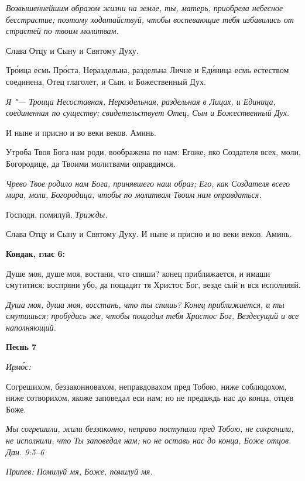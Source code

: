 \itshape Возвышеннейшим образом жизни на земле, ты, матерь, приобрела небесное бесстрастие; поэтому ходатайствуй, чтобы воспевающие тебя избавились от страстей по твоим молитвам.\normalfont{}


Слава Отцу и Сыну и Святому Духу.


Тро́ица есмь Про́ста, Нераздельна, раздельна Личне и Еди́ница есмь естеством соединена, Отец глаголет, и Сын, и Божественный Дух.


\itshape Я "--- Троица Несоставная, Нераздельная, раздельная в Лицах, и Единица, соединенная по существу; свидетельствует Отец, Сын и Божественный Дух.\normalfont{}


И ныне и присно и во веки веков. Аминь.


Утроба Твоя Бога нам роди, воображена по нам: Егоже, яко Создателя всех, моли, Богородице, да Твоими молитвами оправдимся.


\itshape Чрево Твое родило нам Бога, принявшего наш образ; Его, как Создателя всего мира, моли, Богородица, чтобы по молитвам Твоим нам оправдаться.\normalfont{}


Господи, помилуй. \itshape Трижды.\normalfont{}


Слава Отцу и Сыну и Святому Духу. И ныне и присно и во веки веков. Аминь.





\bfseries Кондак, глас 6:\normalfont{}


Душе моя, душе моя, востани, что спиши? конец приближается, и имаши смутитися: воспряни убо, да пощадит тя Христос Бог, везде сый и вся исполняяй.


\itshape Душа моя, душа моя, восстань, что ты спишь? Конец приближается, и ты смутишься; пробудись же, чтобы пощадил тебя Христос Бог, Вездесущий и все наполняющий.\normalfont{}





\bfseries Песнь 7\normalfont{}


\itshape Ирмо́с:\normalfont{}


Согрешихом, беззаконновахом, неправдовахом пред Тобою, ниже соблюдохом, ниже сотворихом, якоже заповедал еси нам; но не предаждь нас до конца, отцев Боже.


\itshape Мы согрешили, жили беззаконно, неправо поступали пред Тобою, не сохранили, не исполнили, что Ты заповедал нам; но не оставь нас до конца, Боже отцов. Дан. 9:5–6\normalfont{}


\itshape Припев:\normalfont{} Помилуй мя, Боже, помилуй мя.


